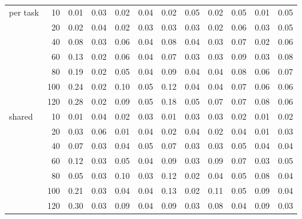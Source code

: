 \begin{tabular}{@{}lrrrrrrrrrrr@{}}
\midrule
per task & 10 & 0.01 & 0.03 & 0.02 & 0.04 & 0.02 & 0.05 & 0.02 & 0.05 & 0.01 & 0.05 \\
 & 20 & 0.02 & 0.04 & 0.02 & 0.03 & 0.03 & 0.03 & 0.02 & 0.06 & 0.03 & 0.05 \\
 & 40 & 0.08 & 0.03 & 0.06 & 0.04 & 0.08 & 0.04 & 0.03 & 0.07 & 0.02 & 0.06 \\
 & 60 & 0.13 & 0.02 & 0.06 & 0.04 & 0.07 & 0.03 & 0.03 & 0.09 & 0.03 & 0.08 \\
 & 80 & 0.19 & 0.02 & 0.05 & 0.04 & 0.09 & 0.04 & 0.04 & 0.08 & 0.06 & 0.07 \\
 & 100 & 0.24 & 0.02 & 0.10 & 0.05 & 0.12 & 0.04 & 0.04 & 0.07 & 0.06 & 0.06 \\
 & 120 & 0.28 & 0.02 & 0.09 & 0.05 & 0.18 & 0.05 & 0.07 & 0.07 & 0.08 & 0.06 \\
\addlinespace
shared & 10 & 0.01 & 0.04 & 0.02 & 0.03 & 0.01 & 0.03 & 0.03 & 0.02 & 0.01 & 0.02 \\
 & 20 & 0.03 & 0.06 & 0.01 & 0.04 & 0.02 & 0.04 & 0.02 & 0.04 & 0.01 & 0.03 \\
 & 40 & 0.07 & 0.03 & 0.04 & 0.05 & 0.07 & 0.03 & 0.03 & 0.05 & 0.04 & 0.04 \\
 & 60 & 0.12 & 0.03 & 0.05 & 0.04 & 0.09 & 0.03 & 0.09 & 0.07 & 0.03 & 0.05 \\
 & 80 & 0.05 & 0.03 & 0.10 & 0.03 & 0.12 & 0.02 & 0.04 & 0.05 & 0.08 & 0.04 \\
 & 100 & 0.21 & 0.03 & 0.04 & 0.04 & 0.13 & 0.02 & 0.11 & 0.05 & 0.09 & 0.04 \\
 & 120 & 0.30 & 0.03 & 0.09 & 0.04 & 0.09 & 0.03 & 0.08 & 0.04 & 0.09 & 0.03 \\
\bottomrule
\end{tabular}
